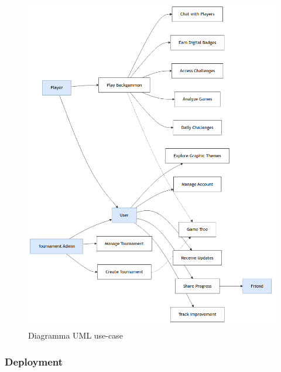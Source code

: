 \documentclass{article}
\begin{document}
\begin{figure}[H]
    \centering
    \includegraphics[width=12cm]{uml-usecase}
    \caption{Diagramma UML use-case}
    \label{fig:use-case}
\end{figure}

\subsubsection{Deployment}
\end{document}
